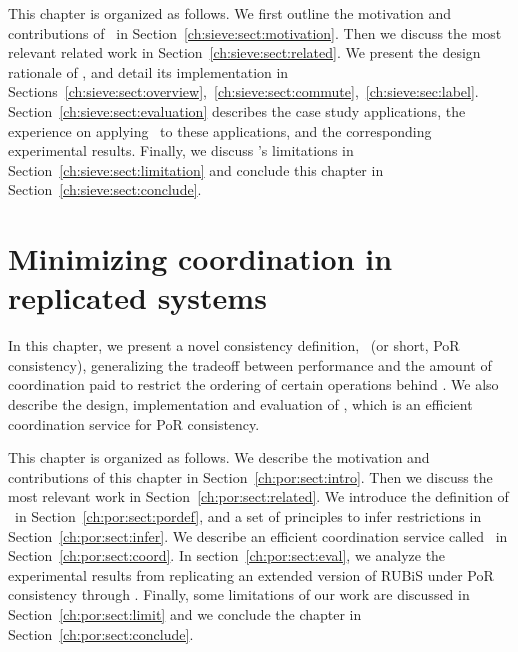 This chapter is organized as follows. We first outline the motivation and contributions of \tool\ in Section~\ref{ch:sieve:sect:motivation}. Then
we discuss the most relevant related work in Section~\ref{ch:sieve:sect:related}. We present the design rationale of \tool,
and detail its implementation in Sections~\ref{ch:sieve:sect:overview},~\ref{ch:sieve:sect:commute},~\ref{ch:sieve:sec:label}. 
Section~\ref{ch:sieve:sect:evaluation} describes the case study applications, the experience on applying \tool\ to these applications, and the corresponding 
experimental results. Finally, we discuss \tool's limitations in Section~\ref{ch:sieve:sect:limitation} 
and conclude this chapter in Section~\ref{ch:sieve:sect:conclude}.









\chapter{Minimizing coordination in replicated systems}
\label{chapter:por}

In this chapter, we present a novel consistency definition, \PRCNF\ (or short, PoR consistency), generalizing
the tradeoff between performance and the amount of coordination paid to restrict the ordering of certain
operations behind \RBCN. We also describe the design, implementation and evaluation of \coordtool, which
is an efficient coordination service for PoR consistency.

This chapter is organized as follows. We describe the motivation and contributions of this chapter
in Section~\ref{ch:por:sect:intro}. Then we discuss the most relevant work in Section~\ref{ch:por:sect:related}. 
We introduce the definition of \PRCN\ in Section~\ref{ch:por:sect:pordef},
and a set of principles to infer restrictions in Section~\ref{ch:por:sect:infer}.
We describe an efficient coordination service called \coordtool\ in Section~\ref{ch:por:sect:coord}. 
In section~\ref{ch:por:sect:eval}, we analyze the experimental results from replicating
an extended version of RUBiS under PoR consistency through \coordtool. 
Finally, some limitations of our work are discussed in Section~\ref{ch:por:sect:limit} 
and we conclude the chapter in Section~\ref{ch:por:sect:conclude}.








